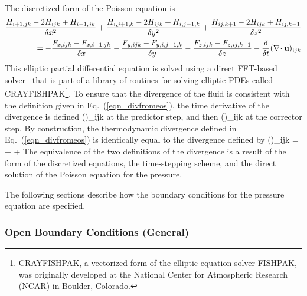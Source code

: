The discretized form of the Poisson equation is
\begin{align}
\frac{H_{i+1,jk}-2H_{ijk}+H_{i-1,jk}}{\delta x^2} +
\frac{H_{i,j+1,k}-2H_{ijk}+H_{i,j-1,k}}{\delta y^2} +
\frac{H_{ij,k+1}-2H_{ijk}+H_{ij,k-1}}{\delta z^2} \notag \\ =
    -\frac{F_{x,ijk} - F_{x,i-1,jk}}{\delta x}
    -\frac{F_{y,ijk} - F_{y,i,j-1,k}}{\delta y}
    -\frac{F_{z,ijk} - F_{z,ij,k-1}}{\delta z} - \frac{\delta}{\delta t}(\nabla\!\cdot {\mathbf{u}})_{ijk}
\label{pe_fin}
\end{align}
This elliptic partial differential equation is solved using a direct FFT-based solver~\cite{Sweet:1} that is part of a library of routines for solving elliptic PDEs called CRAYFISHPAK\footnote{CRAYFISHPAK, a vectorized form of the elliptic equation solver FISHPAK, was originally developed at the National Center for Atmospheric Research (NCAR) in Boulder, Colorado.}. To ensure that the divergence of the fluid is consistent with the definition given in Eq.~(\ref{eqn_divfromeos}), the time derivative of the divergence is defined
\be
   (\nabla\!\cdot \bu)_{ijk} \equiv
\ee
at the predictor step, and then
\be
   (\nabla\!\cdot \bu)_{ijk} \equiv
\ee
at the corrector step. By construction, the thermodynamic divergence defined in Eq.~(\ref{eqn_divfromeos}) is identically equal to the divergence defined by
\be
(\nabla\!\cdot \bu)_{ijk} =  +  + 
\ee
The equivalence of the two definitions of the divergence is a result of the form of the discretized equations, the time-stepping scheme, and the direct solution of the Poisson equation for the pressure.

The following sections describe how the boundary conditions for the pressure equation are specified.


\subsubsection{Open Boundary Conditions (General)}

